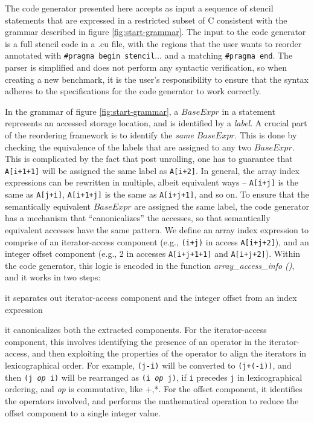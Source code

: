 The code generator presented here accepts as input a sequence of stencil
statements that are expressed in a restricted subset of C consistent with the
grammar described in figure \ref{fig:start-grammar}. The input to the code
generator is a full stencil code in a .cu file, with the regions that the user
wants to reorder annotated with \texttt{\#pragma begin stencil$\ldots$} and a
matching \texttt{\#pragma end}. The parser is simplified and does not perform
any syntactic verification, so when creating a new benchmark, it is the user's
responsibility to ensure that the syntax adheres to the specifications for the
code generator to work correctly. 

In the grammar of figure \ref{fig:start-grammar}, a $\mathit{BaseExpr}$ in a
statement represents an accessed storage location, and is identified by a
\textit{label}. A crucial part of the reordering framework is to identify the
\textit{same} $\mathit{BaseExpr}$. This is done by checking the equivalence of
the labels that are assigned to any two $\mathit{BaseExpr}$. This is
complicated by the fact that post unrolling, one has to guarantee that
\texttt{A[i+1+1]} will be assigned the same label as \texttt{A[i+2]}. In
general, the array index expressions can be rewritten in multiple, albeit
equivalent ways -- \texttt{A[i+j]} is the same as \texttt{A[j+i]},
\texttt{A[i+1+j]} is the same as \texttt{A[i+j+1]}, and so on. To ensure that
the semantically equivalent $\mathit{BaseExpr}$ are assigned the same label,
the code generator has a mechanism that ``canonicalizes'' the accesses, so that
semantically equivalent accesses have the same pattern. We define an array index expression
to comprise of an iterator-access component (e.g., \texttt{(i+j)} in access
\texttt{A[i+j+2]}), and an integer offset component (e.g., 2 in accesses
\texttt{A[i+j+1+1]} and \texttt{A[i+j+2]}). Within the code generator, this
logic is encoded in the function \textit{array\_access\_info ()}, and it works
in two steps: 
\begin{compactenum}
\item it separates out iterator-access component and the integer offset from an index expression
\item it canonicalizes both the extracted components. For the iterator-access
component, this involves identifying the presence of an operator in the
iterator-access, and then exploiting the properties of the operator to align
the iterators in lexicographical order. For example, \texttt{(j-i)} will be
converted to \texttt{(j+(-i))}, and then \texttt{(j \textit{op} i)} will be
rearranged as \texttt{(i \textit{op} j)}, if \texttt{i} precedes \texttt{j} in
lexicographical ordering, and \textit{op} is commutative, like +,*. For the
offset component, it identifies the operators involved, and performs the
mathematical operation to reduce the offset component to a single integer
value.
\end{compactenum}

